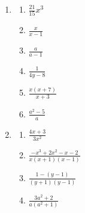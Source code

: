 \begin{description}
\begin{enumerate}[label=\textbf{\thesection.\thetempi.\thetempii}]
\begin{multicols}{4}
\begin{enumerate}[label=\alph*)]
                \item $-2$
                
                \item $-1$
                
                \item $13$
            \end{enumerate}
        \end{multicols}
        
        \setcounter{tempii}{0}
        ~~
        
        \item \begin{multicols}{3}
            \begin{enumerate}[label=\alph*)]
                \item $\frac{21}{15}x^3$
                
                \item $\frac{x}{x -1}$
                
                \item $\frac{a}{a-1}$
                
                \item $\frac{1}{4y-8}$
                
                \item $\frac{x(x+7)}{x+3}$
                
                \item $\frac{a^2-5}{a}$
            \end{enumerate}
        \end{multicols}
        
        \item \begin{multicols}{3}
            \begin{enumerate}[label=\alph*)]
                \item $\frac{4x+3}{3x^2}$
                
                \item $\frac{-x^3+2x^2-x-2}{x(x+1)(x-1)}$
                
                \item $\frac{1-(y-1)}{(y+1)(y-1)}$
                
                \item $\frac{3a^2+2}{a(a^2+1)}$
                

\end{enumerate}
\end{multicols}
\end{enumerate}
\end{description}
